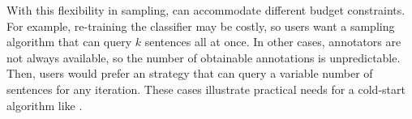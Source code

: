 With this flexibility in sampling,
\alps{} can accommodate different budget
constraints.  For example, re-training the classifier
may be costly, so users want a sampling algorithm that can query $k$ sentences all at
once.  In other cases, annotators are not always available, so the
number of obtainable annotations is unpredictable.
Then, users would prefer an \al{} strategy that can query a variable number of
sentences for any iteration.  These cases illustrate practical
needs for a cold-start algorithm like \alps{}.


